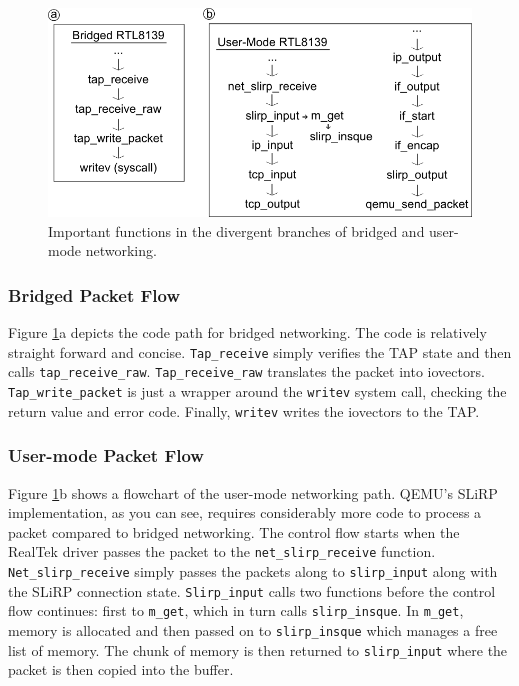 \begin{figure}[!ht]
	\centering
		\includegraphics[scale=0.6]{codepath2_alt}
	\caption{Important functions in the divergent branches of bridged and user-mode networking.}
	\label{fig:codepath2}
\end{figure}
\subsubsection{Bridged Packet Flow}
Figure \ref{fig:codepath2}a depicts the code path for bridged networking.
The code is relatively straight forward and concise.
\texttt{Tap\_receive} simply verifies the TAP state and then calls \texttt{tap\_receive\_raw}.
\texttt{Tap\_receive\_raw} translates the packet into iovectors.
\texttt{Tap\_write\_packet} is just a wrapper around the \texttt{writev} system call, checking the return value and error code.
Finally, \texttt{writev} writes the iovectors to the TAP.

\subsubsection{User-mode Packet Flow}

Figure \ref{fig:codepath2}b shows a flowchart of the user-mode networking path.
QEMU's SLiRP implementation, as you can see, requires considerably more code to process a packet compared to bridged networking.
The control flow starts when the RealTek driver passes the packet to the \texttt{net\_slirp\_receive} function.
\texttt{Net\_slirp\_receive} simply passes the packets along to \texttt{slirp\_input} along with the SLiRP connection state.
\texttt{Slirp\_input} calls two functions before the control flow continues: first to \texttt{m\_get}, which in turn calls \texttt{slirp\_insque}.
In \texttt{m\_get}, memory is allocated and then passed on to \texttt{slirp\_insque} which manages a free list of memory.
The chunk of memory is then returned to \texttt{slirp\_input} where the packet is then copied into the buffer.

